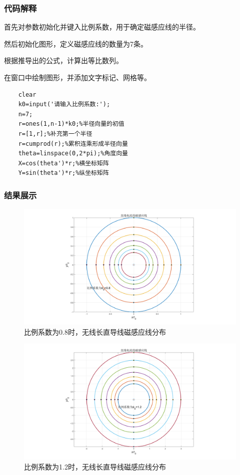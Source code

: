 \documentclass[UTF8]{article}
\numberwithin{figure}{subsection}
\numberwithin{table}{subsection}
\begin{document}
\begin{multicols}{2}
	\subsubsection{代码解释}
	\par 首先对参数初始化并键入比例系数，用于确定磁感应线的半径。
	\par 然后初始化图形，定义磁感应线的数量为7条。
	\par 根据推导出的公式，计算出等比数列。
	\par 在窗口中绘制图形，并添加文字标记、网格等。
	\begin{lstlisting}
    clear 
    k0=input('请输入比例系数:');
    n=7;
    r=ones(1,n-1)*k0;%半径向量的初值
    r=[1,r];%补充第一个半径
    r=cumprod(r);%累积连乘形成半径向量
    theta=linspace(0,2*pi);%角度向量
    X=cos(theta')*r;%横坐标矩阵
    Y=sin(theta')*r;%纵坐标矩阵
	\end{lstlisting}
	\subsubsection{结果展示}
	\begin{figure}[H]
		\centering
		\includegraphics[scale=0.15]{6_0.8.png}
		\caption{比例系数为0.8时，无线长直导线磁感应线分布}
	\end{figure}
	\begin{figure}[H]
		\centering
		\includegraphics[scale=0.15]{6_1.2.png}
		\caption{比例系数为1.2时，无线长直导线磁感应线分布}
	\end{figure}	

\end{multicols}
\end{document}
